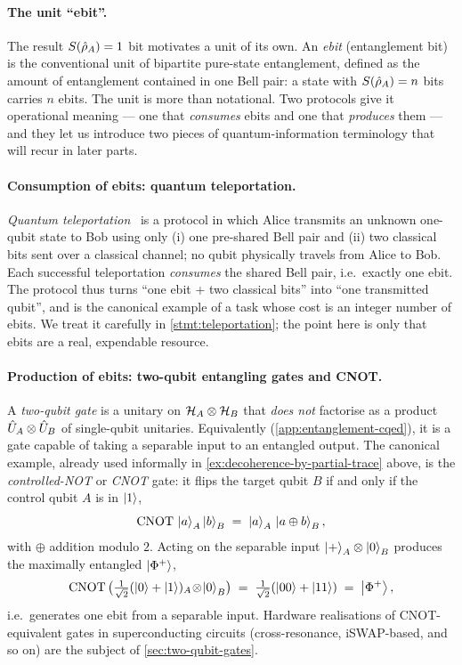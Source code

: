 \begin{example}
\paragraph{The unit ``ebit''.}
The result $S(\hat{\rho}_A)=1$ bit motivates a unit of its own. An
\emph{ebit} (entanglement bit) is the conventional unit of
bipartite pure-state entanglement, defined as the amount of
entanglement contained in one Bell pair: a state with
$S(\hat{\rho}_A)=n$ bits carries $n$ ebits. The unit is more than
notational. Two protocols give it operational meaning --- one
that \emph{consumes} ebits and one that \emph{produces} them ---
and they let us introduce two pieces of quantum-information
terminology that will recur in later parts.

\paragraph{Consumption of ebits: quantum teleportation.}
\emph{Quantum teleportation}~\cite{bennett1993} is a protocol in which Alice
transmits an unknown one-qubit state to Bob using only (i) one
pre-shared Bell pair and (ii) two classical bits sent over a
classical channel; no qubit physically travels from Alice to
Bob. Each successful teleportation \emph{consumes} the shared
Bell pair, i.e.\ exactly one ebit. The protocol thus turns ``one
ebit + two classical bits'' into ``one transmitted qubit'', and
is the canonical example of a task whose cost is an integer
number of ebits. We treat it carefully in \cref{stmt:teleportation}; the
point here is only that ebits are a real, expendable resource.

\paragraph{Production of ebits: two-qubit entangling gates and CNOT.}
A \emph{two-qubit gate} is a unitary on
$\mathcal{H}_A\otimes\mathcal{H}_B$ that \emph{does not} factorise as a
product $\hat{U}_A\otimes\hat{U}_B$ of single-qubit unitaries.
Equivalently (\cref{app:entanglement-cqed}), it is a gate capable
of taking a separable input to an entangled output. The canonical
example, already used informally in
\cref{ex:decoherence-by-partial-trace} above, is the
\emph{controlled-NOT} or \emph{CNOT} gate: it flips the target
qubit $B$ if and only if the control qubit $A$ is in $\ket{1}$,
\begin{equation}
\text{CNOT}\,\ket{a}_A\ket{b}_B
\;=\; \ket{a}_A\,\ket{a\oplus b}_B,
\end{equation}
with $\oplus$ addition modulo $2$. Acting on the separable input
$\ket{+}_A\otimes\ket{0}_B$ produces the maximally entangled
$\ket{\Phi^+}$,
\begin{equation}
\text{CNOT}\,\bigl(\tfrac{1}{\sqrt 2}(\ket{0}+\ket{1})_A\!\otimes\!\ket{0}_B\bigr)
\;=\; \tfrac{1}{\sqrt 2}(\ket{00}+\ket{11})
\;=\; \ket{\Phi^+},
\end{equation}
i.e.\ generates one ebit from a separable input. Hardware
realisations of CNOT-equivalent gates in superconducting circuits
(cross-resonance, iSWAP-based, and so on) are the subject of
\cref{sec:two-qubit-gates}.
\end{example}


